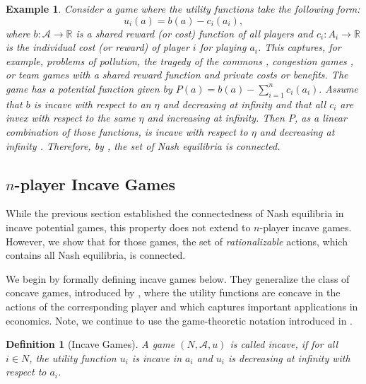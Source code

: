 \documentclass{article}
\newtheorem{definition}{Definition}[section]
\newtheorem{example}{Example}
\newcommand{\R}{\mathbb{R}}
\begin{document}
\begin{example}
    \label{ex:econincave}
    Consider a game where the utility functions take the following form:
    \begin{equation}
        \label{eq:utility}
        u_i(a) = b(a)-c_i(a_i),
    \end{equation}
    where $b: \mathcal{A} \to \R$ is a shared reward (or cost) function of all players and $c_i: A_i \to \R$ is the individual cost (or reward) of player $i$ for playing $a_i$. This captures, for example, problems of pollution, the tragedy of the commons \citep{Hardin1968Tragedy}, congestion games \citep{Rosenthal1973class}, or team games with a shared reward function and private costs or benefits. The game has a potential function given by \(
        P(a) = b(a) - \sum_{i=1}^n c_i(a_i).
    \)
    Assume that $b$ is incave with respect to an $\eta$ and decreasing at infinity and that all $c_i$ are invex with respect to the same $\eta$ and increasing at infinity. Then $P$, as a linear combination of those functions, is incave with respect to $\eta$ and decreasing at infinity \citep{Mishra2008Invexity}. Therefore, by , the set of Nash equilibria is connected.
\end{example}



\subsection{$n$-player Incave Games}
\label{sec:incavegames}






While the previous section established the connectedness of Nash equilibria in incave potential games, this property does not extend to $n$-player incave games. However, we show that for those games, the set of \textit{rationalizable} actions, which contains all Nash equilibria, is connected. 

We begin by formally defining incave games below. They generalize the class of concave games, introduced by \citet{Rosen1965Existence}, where the utility functions are concave in the actions of the corresponding player and which captures important applications in economics. Note, we continue to use the game-theoretic notation introduced in .



\begin{definition}[Incave Games]
    \label{def:incavegames}
    A game $(N,\mathcal{A},u)$ is called incave, if for all $i\in N$, the utility function $u_i$ is incave in $a_i$ and $u_i$ is decreasing at infinity with respect to $a_i$.
\end{definition}
\end{document}
